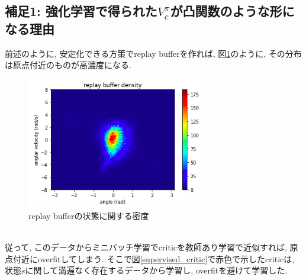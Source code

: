 \documentclass{jsarticle}
\begin{document}
\subsection{補足1: 強化学習で得られた$V^{\pi}_{c}$が凸関数のような形になる理由}
前述のように, 安定化できる方策でreplay bufferを作れば, 図\ref{replay_buffer_density}のように, その分布は原点付近のものが高濃度になる.
\begin{figure}[h]
	\centering
 	\includegraphics[width=8cm]{replay_buffer_density.png}
 	\caption{replay bufferの状態に関する密度} \label{replay_buffer_density}
\end{figure}\\
従って, このデータからミニバッチ学習でcriticを教師あり学習で近似すれば, 原点付近にoverfitしてしまう. 
そこで図\ref{supervised_critic}で赤色で示したcriticは, 状態$s$に関して満遍なく存在するデータから学習し, overfitを避けて学習した.
\end{document}
